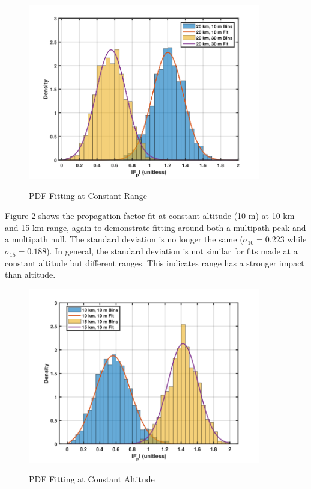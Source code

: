 \begin{figure}[H]
  \begin{center}
\includegraphics[width=4in]{../media/statistics/constant_range_fit.png}
  \end{center}
  \renewcommand{\baselinestretch}{1} \small\normalsize
  \begin{quote}
    \caption[PDF Fitting at Constant Range]{PDF Fitting at Constant Range\label{stat_fig:4}}
  \end{quote}
\end{figure}
\renewcommand{\baselinestretch}{2} \small\normalsize

Figure \ref{stat_fig:5} shows the propagation factor fit at constant altitude (10 m) at 10 km and 15 km range, again to demonstrate fitting around both a multipath peak and a multipath null. The standard deviation is no longer the same ($\sigma_{10} = 0.223$ while $\sigma_{15} = 0.188$). In general, the standard deviation is not similar for fits made at a constant altitude but different ranges. This indicates range has a stronger impact than altitude.

\begin{figure}[H]
  \begin{center}
\includegraphics[width=4in]{../media/statistics/constant_altitude_fit.png}
  \end{center}
  \renewcommand{\baselinestretch}{1} \small\normalsize
  \begin{quote}
    \caption[PDF Fitting at Constant Altitude]{PDF Fitting at Constant Altitude\label{stat_fig:5}}
  \end{quote}
\end{figure}
\renewcommand{\baselinestretch}{2} \small\normalsize

